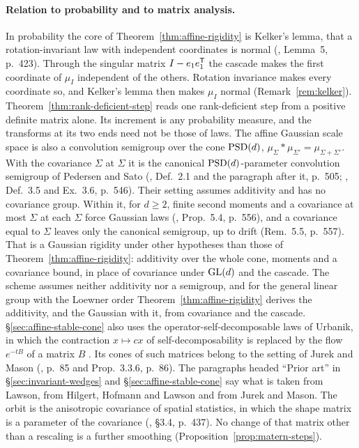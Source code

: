 \paragraph{Relation to probability and to matrix analysis.} In probability the core of
Theorem~\ref{thm:affine-rigidity} is Kelker's lemma, that a rotation-invariant law with independent
coordinates is normal (, Lemma~5, p.~423). Through the
singular matrix $I - e_1e_1^{\mathsf{T}}$ the cascade makes the first coordinate of $\mu_I$ independent of the
others. Rotation invariance makes every coordinate so, and Kelker's lemma then makes $\mu_I$ normal
(Remark~\ref{rem:kelker}). Theorem~\ref{thm:rank-deficient-step} reads one rank-deficient step from a
positive definite matrix alone. Its increment is any probability measure, and the transforms at its
two ends need not be those of laws. The affine Gaussian
scale space is also a convolution semigroup over the cone $\mathrm{PSD}(d)$,
$\mu_\Sigma * \mu_{\Sigma'} = \mu_{\Sigma+\Sigma'}$. With the covariance $\Sigma$ at $\Sigma$ it is the
canonical $\mathrm{PSD}(d)$-parameter convolution semigroup of Pedersen and Sato (,
Def.~2.1 and the paragraph after it, p.~505; , Def.~3.5 and Ex.~3.6,
p.~546). Their setting assumes additivity and has no covariance
group. Within it, for $d \ge 2$, finite second moments and a covariance at most $\Sigma$ at each $\Sigma$ force
Gaussian laws (, Prop.~5.4, p.~556), and a covariance equal to $\Sigma$
leaves only the canonical semigroup, up to drift (Rem.~5.5, p.~557). That is a Gaussian rigidity under
other hypotheses than those of Theorem~\ref{thm:affine-rigidity}: additivity over the whole cone,
moments and a covariance bound, in place of covariance under $\mathrm{GL}(d)$ and the cascade. The scheme assumes neither additivity nor a semigroup, and for the general linear group with the
Loewner order Theorem~\ref{thm:affine-rigidity} derives the additivity, and the Gaussian with it, from
covariance and the cascade. \S\ref{sec:affine-stable-cone} also uses the operator-self-decomposable
laws of Urbanik, in which the contraction $x \mapsto cx$ of self-decomposability is replaced by the
flow $e^{-tB}$ of a matrix $B$ . Its cones of such matrices belong to the
setting of Jurek and Mason (, p.~85 and Prop.~3.3.6, p.~86). The paragraphs
headed ``Prior art'' in \S\ref{sec:invariant-wedges} and \S\ref{sec:affine-stable-cone} say what is
taken from Lawson, from Hilgert, Hofmann and Lawson and from Jurek and Mason. The \Matern{} orbit is
the anisotropic \Matern{} covariance of spatial statistics, in which the shape matrix is a parameter
of the covariance (, \S3.4, p.~437). No change of that matrix other than a
rescaling is a further smoothing (Proposition~\ref{prop:matern-steps}).

